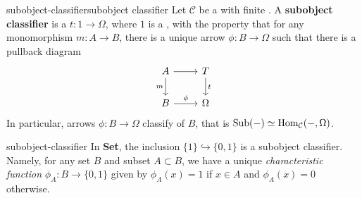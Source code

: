 \begin{topic}{subobject-classifier}{subobject classifier}
    Let $\mathcal{C}$ be a  with finite . A \textbf{subobject classifier} is a  $t : 1 \to \Omega$, where $1$ is a , with the property that for any monomorphism $m : A \to B$, there is a unique arrow $\phi : B \to \Omega$ such that there is a pullback diagram
    \[ \begin{tikzcd} A \arrow[swap]{d}{m} \arrow{r} & T \arrow{d}{t} \\ B \arrow{r}{\phi} & \Omega \end{tikzcd} \]
    In particular, arrows $\phi : B \to \Omega$ classify  of $B$, that is $\textup{Sub}(-) \simeq \text{Hom}_\mathcal{C}(-, \Omega)$.
\end{topic}

\begin{example}{subobject-classifier}
    In \textbf{Set}, the inclusion $\{ 1 \} \hookrightarrow \{ 0, 1 \}$ is a subobject classifier. Namely, for any set $B$ and subset $A \subset B$, we have a unique \textit{characteristic function} $\phi_A : B \to \{ 0, 1 \}$ given by $\phi_A(x) = 1$ if $x \in A$ and $\phi_A(x) = 0$ otherwise.
\end{example}

